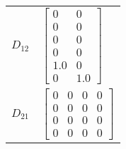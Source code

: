 \begin{tabular}{cl}
 $D_{12}$ & $\left[\begin{matrix}0 & 0\\0 & 0\\0 & 0\\0 & 0\\1.0 & 0\\0 & 1.0\end{matrix}\right]$                                                              \\
 $D_{21}$ & $\left[\begin{matrix}0 & 0 & 0 & 0\\0 & 0 & 0 & 0\\0 & 0 & 0 & 0\\0 & 0 & 0 & 0\end{matrix}\right]$                                                \\
\hline
\end{tabular}